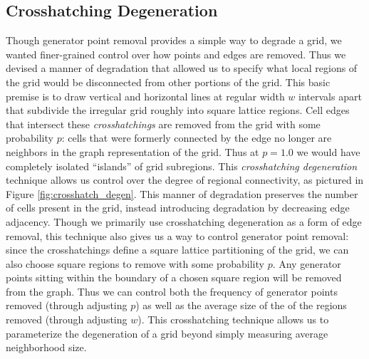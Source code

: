 \documentclass[a4paper,11pt]{report}
\begin{document}
\subsection{Crosshatching Degeneration}
\label{subsec:ch_degen}
Though generator point removal provides a simple way to degrade a grid, we wanted finer-grained control over how points and edges are removed. Thus we devised a manner of degradation that allowed us to specify what local regions of the grid would be disconnected from other portions of the grid. This basic premise is to draw vertical and horizontal lines at regular width $w$ intervals apart that subdivide the irregular grid roughly into square lattice regions. Cell edges that intersect these \textit{crosshatchings} are removed from the grid with some probability $p$: cells that were formerly connected by the edge no longer are neighbors in the graph representation of the grid. Thus at $p=1.0$ we would have completely isolated ``islands'' of grid subregions. This \textit{crosshatching degeneration} technique allows us control over the degree of regional connectivity, as pictured in Figure \ref{fig:crosshatch_degen}. This manner of degradation preserves the number of cells present in the grid, instead introducing degradation by decreasing edge adjacency. Though we primarily use crosshatching degeneration as a form of edge removal, this technique also gives us a way to control generator point removal: since the crosshatchings define a square lattice partitioning of the grid, we can also choose square regions to remove with some probability $p$. Any generator points sitting within the boundary of a chosen square region will be removed from the graph. Thus we can control both the frequency of generator points removed (through adjusting $p$) as well as the average size of the of the regions removed (through adjusting $w$). This crosshatching technique allows us to parameterize the degeneration of a grid beyond simply measuring average neighborhood size.
\end{document}
